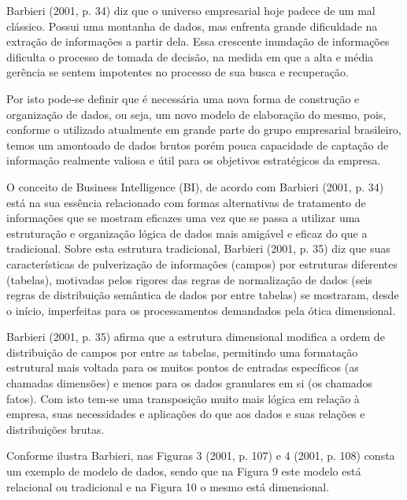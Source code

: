 \documentclass[a4paper]{article}
\begin{document}
{
\textsf{Barbieri (2001, p. 34) diz que o universo empresarial hoje padece de um mal cl\'assico. Possui uma montanha de
dados, mas enfrenta grande dificuldade na extra\c{c}\~ao de informa\c{c}\~oes a partir dela. Essa crescente
inunda\c{c}\~ao de informa\c{c}\~oes dificulta o processo de tomada de decis\~ao, na medida em que a alta e m\'edia
ger\^encia se sentem impotentes no processo de sua busca e recupera\c{c}\~ao.}}

{\sffamily
Por isto pode-se definir que \'e necess\'aria uma nova forma de constru\c{c}\~ao e organiza\c{c}\~ao de dados, ou seja,
um novo modelo de elabora\c{c}\~ao do mesmo, pois, conforme o utilizado atualmente em grande parte do grupo empresarial
brasileiro, temos um amontoado de dados brutos por\'em pouca capacidade de capta\c{c}\~ao de informa\c{c}\~ao realmente
valiosa e \'util para os objetivos estrat\'egicos da empresa.}

{
\textsf{O conceito de Business Intelligence (BI), de acordo com Barbieri (2001, p. 34) est\'a na sua ess\^encia
relacionado com formas alternativas de tratamento de informa\c{c}\~oes que se mostram eficazes uma vez que se passa a
utilizar uma estrutura\c{c}\~ao e organiza\c{c}\~ao l\'ogica de dados mais amig\'avel e eficaz do que a tradicional.
Sobre esta estrutura tradicional, Barbieri (2001, p. 35) diz que suas caracter\'isticas de pulveriza\c{c}\~ao de
informa\c{c}\~oes (campos) por estruturas diferentes (tabelas), motivadas pelos rigores das regras de
normaliza\c{c}\~ao de dados (seis regras de distribui\c{c}\~ao sem\^antica de dados por entre tabelas) se mostraram,
desde o in\'icio, imperfeitas para os processamentos demandados pela \'otica dimensional.}}

{
\textsf{Barbieri (2001, p. 35) afirma que a estrutura dimensional modifica a ordem de distribui\c{c}\~ao de campos por
entre as tabelas, permitindo uma formata\c{c}\~ao estrutural mais voltada para os muitos pontos de entradas
espec\'ificos (as chamadas dimens\~oes) e menos para os dados granulares em si (os chamados fatos). Com isto tem-se uma
transposi\c{c}\~ao muito mais l\'ogica em rela\c{c}\~ao \`a empresa, suas necessidades e aplica\c{c}\~oes do que aos
dados e suas rela\c{c}\~oes e distribui\c{c}\~oes brutas.}}

{
\textsf{Conforme ilustra Barbieri, nas Figuras 3 (2001, p. 107) e 4 (2001, p. 108) consta um exemplo de modelo de dados,
sendo que na Figura 9 este modelo est\'a relacional ou tradicional e na Figura 10 o mesmo est\'a dimensional.}}
\end{document}
